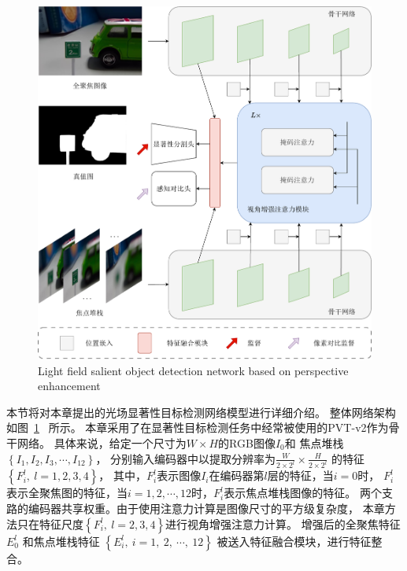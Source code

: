% 
% 
%
%
%
%
%
\begin{figure}[!ht]
	\centering
	\includegraphics[width=0.95\linewidth]{figures/chapter4/chpt4_overview}
	{Light field salient object detection network based on perspective enhancement}  
	\label{cpt4_fig1:chpt4_overview}
\end{figure}
%
%
%
%
%
本节将对本章提出的光场显著性目标检测网络模型进行详细介绍。
整体网络架构如图~\ref{cpt4_fig1:chpt4_overview}
~所示。
本章采用了在显著性目标检测任务中经常被使用的PVT-v2作为骨干网络。
具体来说，给定一个尺寸为$W \times H$的RGB图像$I_{0}$和
焦点堆栈$\left \{  I_{1},I_{2},I_{3},\cdots,I_{12} \right \} $，
分别输入编码器中以提取分辨率为$\frac{W}{2 \times 2^{l}} \times \frac{H}{2  \times 2^{l}} $ 
的特征$\left \{ F_{i}^{l},~l=1,2,3,4 \right \}$，
其中，$F_{i}^{l}$表示图像$I_{i}$在编码器第$l$层的特征，当$i=0$时，
$F_{i}^{l}$表示全聚焦图的特征，当$i=1,2,\cdots,12$时，$F_{i}^{l}$表示焦点堆栈图像的特征。
两个支路的编码器共享权重。由于使用注意力计算是图像尺寸的平方级复杂度，
本章方法只在特征尺度$\left \{ F_{i}^{l},~ l = 2, 3, 4\right \}$进行视角增强注意力计算。
增强后的全聚焦特征$ E_{0}^{l} $ 和焦点堆栈特征 $\left \{ E_{i}^{l},~i=1,~2,~ \cdots,~12 \right \}$
被送入特征融合模块，进行特征整合。
